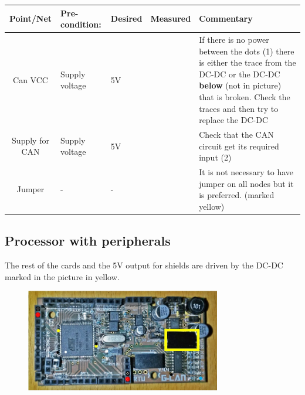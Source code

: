 \begin{table}[ht]
\begin{tabularx}{\textwidth}{|c|>{\hsize=0.6\hsize}X|>{\hsize=0.6\hsize}X|c|>{\hsize=1.8\hsize}X|} %
\hline 
Point/Net & Pre-condition: & Desired & Measured & Commentary \\ 
\hline 
Can VCC & Supply voltage & 5V &   & If there is no power between the dots (1) there is either the trace from the DC-DC or the DC-DC \textbf{below} (not in picture) that is broken. Check the traces and then try to replace the DC-DC \\ 
\hline 
Supply for CAN & Supply voltage & 5V  &    & Check that the CAN circuit get its required input (2) \\ 
\hline 
Jumper & - & - &   & It is not necessary to have jumper on all nodes but it is preferred. (marked yellow) \\  
\hline
\end{tabularx}
\end{table}

\newpage
\subsection{Processor with peripherals}
The rest of the cards and the 5V output for shields are driven by the DC-DC marked in the picture in yellow.
\begin{figure}[!ht]
	\begin{center}
		\includegraphics[width=0.76\textwidth]{./Images/Unit-Test-CAN/CAN_processor.jpg}
		\label{CAN_processor}
	\end{center}
\end{figure}

